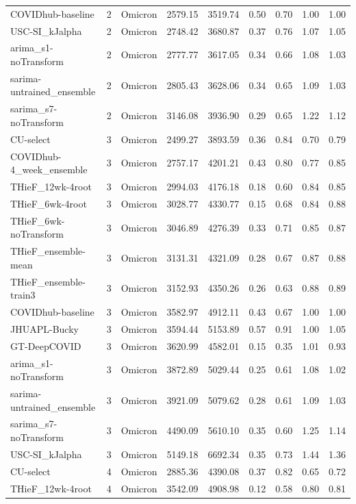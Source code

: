 \documentclass[12pt]{article}
\begin{document}
\begin{longtable}{lrlrrrrrr}
  COVIDhub-baseline & 2 & Omicron & 2579.15 & 3519.74 & 0.50 & 0.70 & 1.00 & 1.00 \\ 
  USC-SI\_kJalpha & 2 & Omicron & 2748.42 & 3680.87 & 0.37 & 0.76 & 1.07 & 1.05 \\ 
  arima\_s1-noTransform & 2 & Omicron & 2777.77 & 3617.05 & 0.34 & 0.66 & 1.08 & 1.03 \\ 
  sarima-untrained\_ensemble & 2 & Omicron & 2805.43 & 3628.06 & 0.34 & 0.65 & 1.09 & 1.03 \\ 
  sarima\_s7-noTransform & 2 & Omicron & 3146.08 & 3936.90 & 0.29 & 0.65 & 1.22 & 1.12 \\ 
  CU-select & 3 & Omicron & 2499.27 & 3893.59 & 0.36 & 0.84 & 0.70 & 0.79 \\ 
  COVIDhub-4\_week\_ensemble & 3 & Omicron & 2757.17 & 4201.21 & 0.43 & 0.80 & 0.77 & 0.85 \\ 
  THieF\_12wk-4root & 3 & Omicron & 2994.03 & 4176.18 & 0.18 & 0.60 & 0.84 & 0.85 \\ 
  THieF\_6wk-4root & 3 & Omicron & 3028.77 & 4330.77 & 0.15 & 0.68 & 0.84 & 0.88 \\ 
  THieF\_6wk-noTransform & 3 & Omicron & 3046.89 & 4276.39 & 0.33 & 0.71 & 0.85 & 0.87 \\ 
  THieF\_ensemble-mean & 3 & Omicron & 3131.31 & 4321.09 & 0.28 & 0.67 & 0.87 & 0.88 \\ 
  THieF\_ensemble-train3 & 3 & Omicron & 3152.93 & 4350.26 & 0.26 & 0.63 & 0.88 & 0.89 \\ 
  COVIDhub-baseline & 3 & Omicron & 3582.97 & 4912.11 & 0.43 & 0.67 & 1.00 & 1.00 \\ 
  JHUAPL-Bucky & 3 & Omicron & 3594.44 & 5153.89 & 0.57 & 0.91 & 1.00 & 1.05 \\ 
  GT-DeepCOVID & 3 & Omicron & 3620.99 & 4582.01 & 0.15 & 0.35 & 1.01 & 0.93 \\ 
  arima\_s1-noTransform & 3 & Omicron & 3872.89 & 5029.44 & 0.25 & 0.61 & 1.08 & 1.02 \\ 
  sarima-untrained\_ensemble & 3 & Omicron & 3921.09 & 5079.62 & 0.28 & 0.61 & 1.09 & 1.03 \\ 
  sarima\_s7-noTransform & 3 & Omicron & 4490.09 & 5610.10 & 0.35 & 0.60 & 1.25 & 1.14 \\ 
  USC-SI\_kJalpha & 3 & Omicron & 5149.18 & 6692.34 & 0.35 & 0.73 & 1.44 & 1.36 \\ 
  CU-select & 4 & Omicron & 2885.36 & 4390.08 & 0.37 & 0.82 & 0.65 & 0.72 \\ 
  THieF\_12wk-4root & 4 & Omicron & 3542.09 & 4908.98 & 0.12 & 0.58 & 0.80 & 0.81 \\ 

\end{longtable}
\end{document}
